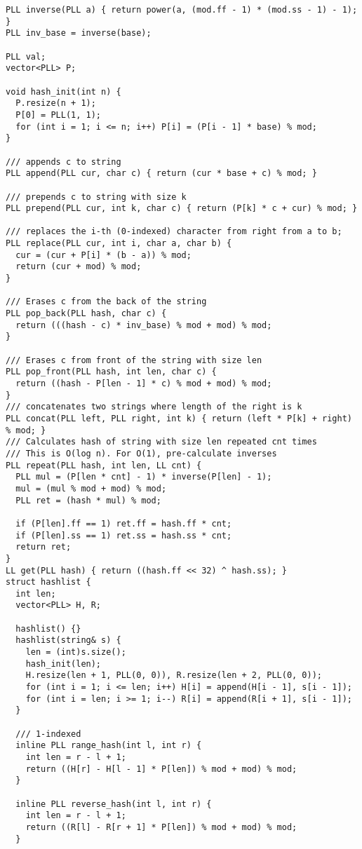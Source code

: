\documentclass[FSZ,a4paper,onesided]{article}
\begin{document}
\begin{multicols*}{\COLS}
\begin{lstlisting}
PLL inverse(PLL a) { return power(a, (mod.ff - 1) * (mod.ss - 1) - 1); }
PLL inv_base = inverse(base);

PLL val;
vector<PLL> P;

void hash_init(int n) {
  P.resize(n + 1);
  P[0] = PLL(1, 1);
  for (int i = 1; i <= n; i++) P[i] = (P[i - 1] * base) % mod;
}

/// appends c to string
PLL append(PLL cur, char c) { return (cur * base + c) % mod; }

/// prepends c to string with size k
PLL prepend(PLL cur, int k, char c) { return (P[k] * c + cur) % mod; }

/// replaces the i-th (0-indexed) character from right from a to b;
PLL replace(PLL cur, int i, char a, char b) {
  cur = (cur + P[i] * (b - a)) % mod;
  return (cur + mod) % mod;
}

/// Erases c from the back of the string
PLL pop_back(PLL hash, char c) {
  return (((hash - c) * inv_base) % mod + mod) % mod;
}

/// Erases c from front of the string with size len
PLL pop_front(PLL hash, int len, char c) {
  return ((hash - P[len - 1] * c) % mod + mod) % mod;
}
/// concatenates two strings where length of the right is k
PLL concat(PLL left, PLL right, int k) { return (left * P[k] + right) % mod; }
/// Calculates hash of string with size len repeated cnt times
/// This is O(log n). For O(1), pre-calculate inverses
PLL repeat(PLL hash, int len, LL cnt) {
  PLL mul = (P[len * cnt] - 1) * inverse(P[len] - 1);
  mul = (mul % mod + mod) % mod;
  PLL ret = (hash * mul) % mod;

  if (P[len].ff == 1) ret.ff = hash.ff * cnt;
  if (P[len].ss == 1) ret.ss = hash.ss * cnt;
  return ret;
}
LL get(PLL hash) { return ((hash.ff << 32) ^ hash.ss); }
struct hashlist {
  int len;
  vector<PLL> H, R;

  hashlist() {}
  hashlist(string& s) {
    len = (int)s.size();
    hash_init(len);
    H.resize(len + 1, PLL(0, 0)), R.resize(len + 2, PLL(0, 0));
    for (int i = 1; i <= len; i++) H[i] = append(H[i - 1], s[i - 1]);
    for (int i = len; i >= 1; i--) R[i] = append(R[i + 1], s[i - 1]);
  }

  /// 1-indexed
  inline PLL range_hash(int l, int r) {
    int len = r - l + 1;
    return ((H[r] - H[l - 1] * P[len]) % mod + mod) % mod;
  }

  inline PLL reverse_hash(int l, int r) {
    int len = r - l + 1;
    return ((R[l] - R[r + 1] * P[len]) % mod + mod) % mod;
  }


\end{lstlisting}
\end{multicols*}
\end{document}
